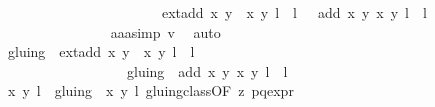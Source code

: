 \begin{isabellebody}
\ \ \ \ \ \ \ \ \ \ \ \ \ \ \ \ \ \ \ \ \ \ \ {\isacharbraceleft}{\isacharparenleft}ext{\isacharunderscore}add\ {\isacharparenleft}x{\isacharcomma}\ y{\isacharparenright}\ {\isacharparenleft}{\isasymtau}\ {\isacharparenleft}x{\isacharprime}{\isacharcomma}\ y{\isacharprime}{\isacharparenright}{\isacharparenright}{\isacharcomma}\ l\ {\isacharplus}\ l{\isacharprime}\ {\isacharplus}\ {}{\isacharparenright}{\isacharcomma}\ {\isacharparenleft}add\ {\isacharparenleft}x{\isacharcomma}\ y{\isacharparenright}\ {\isacharparenleft}x{\isacharprime}{\isacharcomma}\ y{\isacharprime}{\isacharparenright}{\isacharcomma}\ l\ {\isacharplus}\ l{\isacharprime}{\isacharparenright}{\isacharbraceright}{\isachardoublequoteclose}\isanewline
\ \ \ \ \ \ \ \ \ \ \ \ \ \ \isamarkupfalse%
\ aaa{\isacharunderscore}simp\ v{}\ \isamarkupfalse%
\ auto\ \ \ \ \ \ \ \ \ \ \isanewline
\ \ \ \ \ \ \ \ \ \ \ \ \isamarkupfalse%
\ {\isachardoublequoteopen}gluing\ {\isacharbackquote}{\isacharbackquote}\ {\isacharbraceleft}{\isacharparenleft}ext{\isacharunderscore}add\ {\isacharparenleft}x{\isacharcomma}\ y{\isacharparenright}\ {\isacharparenleft}{\isasymtau}\ {\isacharparenleft}x{\isacharprime}{\isacharcomma}\ y{\isacharprime}{\isacharparenright}{\isacharparenright}{\isacharcomma}\ l\ {\isacharplus}\ l{\isacharprime}\ {\isacharplus}\ {}{\isacharparenright}{\isacharbraceright}\ {\isacharequal}\isanewline
\ \ \ \ \ \ \ \ \ \ \ \ \ \ \ \ \ \ gluing\ {\isacharbackquote}{\isacharbackquote}\ {\isacharbraceleft}{\isacharparenleft}add\ {\isacharparenleft}x{\isacharcomma}\ y{\isacharparenright}\ {\isacharparenleft}x{\isacharprime}{\isacharcomma}\ y{\isacharprime}{\isacharparenright}{\isacharcomma}\ l\ {\isacharplus}\ l{\isacharprime}{\isacharparenright}{\isacharbraceright}{\isachardoublequoteclose}\ \isanewline
\ \ \ \ \ \ \ \ \ \ \ \ \ \ \isamarkupfalse%
\ {\isacartoucheopen}{\isacharbraceleft}{\isacharparenleft}{\isacharparenleft}x{\isacharcomma}\ y{\isacharparenright}{\isacharcomma}\ l{\isacharparenright}{\isacharbraceright}\ {\isacharslash}{\isacharslash}\ gluing\ {\isacharequal}\ {\isacharbraceleft}{\isacharbraceleft}{\isacharparenleft}{\isacharparenleft}x{\isacharcomma}\ y{\isacharparenright}{\isacharcomma}\ l{\isacharparenright}{\isacharbraceright}{\isacharbraceright}{\isacartoucheclose}\ gluing{\isacharunderscore}class{\isacharbrackleft}OF\ z{}\ p{\isacharunderscore}q{\isacharunderscore}expr{\isacharparenleft}{}{\isacharparenright}{\isacharbrackright}\ \isanewline
\ \ \ \ \ \ \ \ \ \ \ \ \ \ \isamarkupfalse%

\end{isabellebody}
